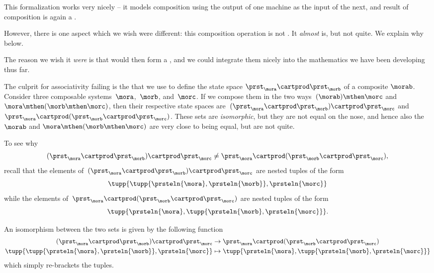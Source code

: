 This formalization works very nicely -- it models composition using the output of one machine as the input of the next, and result of composition is again a .

However, there is one aspect which we wish were different: this composition operation is not .
It \emph{almost} is, but not quite.
We explain why below.

The reason we wish it \emph{were}  is that  would then form a , and we could integrate them nicely into the mathematics we have been developing thus far.

The culprit for associativity failing is the  that we use to define the state space $\prst_{\mora} \cartprod \prst_{\morb}$ of a composite  $\morab$.
Consider three composable systems~$\mora$,~$\morb$, and~$\morc$.
If we compose them in the two ways~$(\morab) \mthen \morc$ and~$\mora \mthen (\morb \mthen \morc)$, then their respective state spaces are~$(\prst_{\mora} \cartprod \prst_{\morb}) \cartprod \prst_{\morc}$ and~$\prst_{\mora} \cartprod (\prst_{\morb} \cartprod \prst_{\morc})$.
These sets are \emph{isomorphic}, but they are not equal on the nose, and hence also the  $\morab$ and $\mora \mthen (\morb \mthen \morc)$ are very close to being equal, but are not quite.

To see why
\begin{equation}
    \label{eq:assoc-fails1}
    (\prst_{\mora} \cartprod \prst_{\morb}) \cartprod \prst_{\morc} \neq \prst_{\mora} \cartprod (\prst_{\morb} \cartprod \prst_{\morc}),
\end{equation}
recall that the elements of~$(\prst_{\mora} \cartprod \prst_{\morb}) \cartprod \prst_{\morc}$ are nested tuples of the form
\begin{equation}
    \tupp{ \tupp{\prsteln{\mora}, \prsteln{\morb}}, \prsteln{\morc} }
\end{equation}
while the elements of~$\prst_{\mora} \cartprod (\prst_{\morb} \cartprod \prst_{\morc})$ are nested tuples of the form
\begin{equation}
    \tupp{\prsteln{\mora}, \tupp{\prsteln{\morb}, \prsteln{\morc}} }.
\end{equation}

An isomorphism between the two sets is given by the following function
\begin{equation}
    \label{eq:assoc-fails2}
    \begin{aligned}
        (\prst_{\mora} \cartprod \prst_{\morb})
        \cartprod \prst_{\morc}                                           & \to \prst_{\mora} \cartprod (\prst_{\morb} \cartprod \prst_{\morc}) \\
        \tupp{ \tupp{\prsteln{\mora}, \prsteln{\morb}}, \prsteln{\morc} } & \mapsto \tupp{\prsteln{\mora}, \tupp{\prsteln{\morb}, \prsteln{\morc}} }
    \end{aligned}
\end{equation}
which simply re-brackets the tuples.

